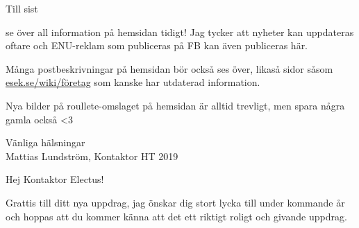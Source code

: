 \documentclass[10pt]{article}
\begin{document}
Till sist
\begin{dashlist}
    \item se över all information på hemsidan tidigt! Jag tycker att nyheter kan uppdateras oftare och ENU-reklam som publiceras på FB kan även publiceras här. 
    \item Många postbeskrivningar på hemsidan bör också ses över, likaså sidor såsom \url{esek.se/wiki/företag} som kanske har utdaterad information. 
    \item Nya bilder på roullete-omslaget på hemsidan är alltid trevligt, men spara några gamla också <3
\end{dashlist}


\vspace{1cm}


\begin{itshape}
Vänliga hälsningar\\
Mattias Lundström, Kontaktor HT 2019\\
\end{itshape}

\newpage

Hej Kontaktor Electus!

Grattis till ditt nya uppdrag, jag önskar dig stort lycka till under kommande år och hoppas att du kommer känna att det ett riktigt roligt och givande uppdrag.
\end{document}
